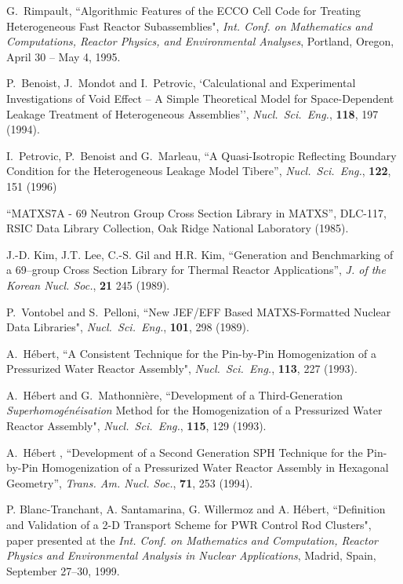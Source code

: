 \begin{thebibliography}{99}
G.~Rimpault, ``Algorithmic Features of the ECCO Cell Code for Treating
Heterogeneous Fast Reactor Subassemblies", {\sl Int. Conf. on
Mathematics and Computations, Reactor Physics, and Environmental Analyses},
Portland, Oregon, April 30 -- May 4, 1995.

P.~Benoist, J.~Mondot and I.~Petrovic, `Calculational and Experimental
Investigations of Void Effect -- A Simple Theoretical Model for Space-Dependent
Leakage Treatment of Heterogeneous Assemblies'', {\sl Nucl.~Sci.~Eng.}, {\bf
118}, 197 (1994).

I.~Petrovic, P.~Benoist and G.~Marleau, ``A Quasi-Isotropic Reflecting Boundary
Condition for the Heterogeneous Leakage Model Tibere'', {\sl Nucl.~Sci.~Eng.},
{\bf 122}, 151 (1996)

``MATXS7A - 69 Neutron Group Cross Section Library in MATXS'', DLC-117, RSIC
Data Library  Collection, Oak Ridge National Laboratory (1985).

J.-D. Kim, J.T. Lee, C.-S. Gil and H.R. Kim, ``Generation and Benchmarking of a 69--group Cross Section Library for Thermal Reactor Applications'', {\sl J. of the Korean Nucl. Soc.}, {\bf 21} 245 (1989).

P.~Vontobel and S.~Pelloni, ``New JEF/EFF Based MATXS-Formatted Nuclear Data
Libraries", {\sl Nucl.~Sci.~Eng.}, {\bf 101}, 298 (1989).

A.~H\'ebert, ``A Consistent Technique for the Pin-by-Pin Homogenization of a
Pressurized Water Reactor Assembly", {\sl Nucl.~Sci.~Eng.}, {\bf 113}, 227
(1993).

A.~H\'ebert and G.~Mathonni\`ere, ``Development of a Third-Generation {\sl
Superhomog\'en\'eisation} Method for the Homogenization of a Pressurized Water
Reactor Assembly", {\sl Nucl.~Sci.~Eng.}, {\bf 115}, 129 (1993).

A.~H\'ebert , ``Development of a Second Generation SPH Technique for the
Pin-by-Pin Homogenization of a Pressurized Water Reactor Assembly in Hexagonal
Geometry'', {\sl Trans. Am. Nucl. Soc.}, {\bf 71}, 253 (1994).

P. Blanc-Tranchant, A. Santamarina, G. Willermoz and A. H\'ebert, ``Definition and Validation of a 2-D Transport
Scheme for PWR Control Rod Clusters", paper presented at the {\sl Int. Conf. on Mathematics and Computation,
Reactor Physics and Environmental Analysis in Nuclear Applications}, Madrid, Spain, September 27--30, 1999.


\end{thebibliography}
